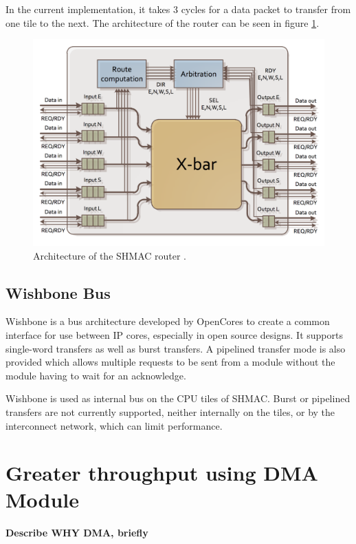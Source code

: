 In the current implementation, it takes 3 cycles for a data packet to transfer from one tile to the next. 
The architecture of the router can be seen in figure \ref{fig:shmac-router}.

\begin{figure}[htb]
    \centering
    \includegraphics[width=1.0\textwidth]{Figures/Heterogeneous/SHMACRouter}
    \caption{Architecture of the SHMAC router \cite{shmac-plan}.}
    \label{fig:shmac-router}
\end{figure}

\subsection{Wishbone Bus}

Wishbone is a bus architecture developed by OpenCores to create a common interface for use between IP cores, especially in
open source designs. It supports single-word transfers as well as burst transfers. A pipelined transfer mode is also provided
which allows multiple requests to be sent from a module without the module having to wait for an acknowledge.

Wishbone is used as internal bus on the CPU tiles of SHMAC. Burst or pipelined transfers are
not currently supported, neither internally on the tiles, or by the interconnect network, which can limit performance.

\section{Greater throughput using DMA Module}

\textbf{Describe WHY DMA, briefly}

